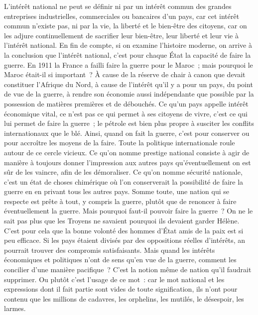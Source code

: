 \documentclass[french,twoside]{book} %
\begin{document}
L'intérêt national ne peut se définir ni par un intérêt commun des grandes entreprises industrielles, commerciales ou bancaires d'un pays, car cet intérêt commun n'existe pas, ni par la vie, la liberté et le bien-être des citoyens, car on les adjure continuellement de sacrifier leur bien-être, leur liberté et leur vie à l'intérêt national. En fin de compte, si on examine l'histoire moderne, on arrive à la conclusion que l'intérêt national, c'est pour chaque État la capacité de faire la guerre. En 1911 la France a failli faire la guerre pour le Maroc ; mais pourquoi le Maroc était-il si important ? À cause de la réserve de chair à canon que devait constituer l'Afrique du Nord, à cause de l'intérêt qu'il y a pour un pays, du point de vue de la guerre, à rendre son économie aussi indépendante que possible par la possession de matières premières et de débouchés. Ce qu'un pays appelle intérêt économique vital, ce n'est pas ce qui permet à ses citoyens de vivre, c'est ce qui lui permet de faire la guerre ; le pétrole est bien plus propre à susciter les conflits internationaux que le blé. Ainsi, quand on fait la guerre, c'est pour conserver ou pour accroître les moyens de la faire. Toute la politique internationale roule autour de ce cercle vicieux. Ce qu'on nomme prestige national consiste à agir de manière à toujours donner l'impression aux autres pays qu'éventuellement on est sûr de les vaincre, afin de les démoraliser. Ce qu'on nomme sécurité nationale, c'est un état de choses chimérique où l'on conserverait la possibilité de faire la guerre en en privant tous les autres pays. Somme toute, une nation qui se respecte est prête à tout, y compris la guerre, plutôt que de renoncer à faire éventuellement la guerre. Mais pourquoi faut-il pouvoir faire la guerre ? On ne le sait pas plus que les Troyens ne savaient pourquoi ils devaient garder Hélène. C'est pour cela que la bonne volonté des hommes d'État amis de la paix est si peu efficace. Si les pays étaient divisés par des oppositions réelles d'intérêts, an pourrait trouver des compromis satisfaisants. Mais quand les intérêts économiques et politiques n'ont de sens qu'en vue de la guerre, comment les concilier d'une manière pacifique ? C'est la notion même de nation qu'il faudrait supprimer. Ou plutôt c'est l'usage de ce mot : car le mot national et les expressions dont il fait partie sont vides de toute signification, ils n'ont pour contenu que les millions de cadavres, les orphelins, les mutilés, le désespoir, les larmes.\par
\end{document}
